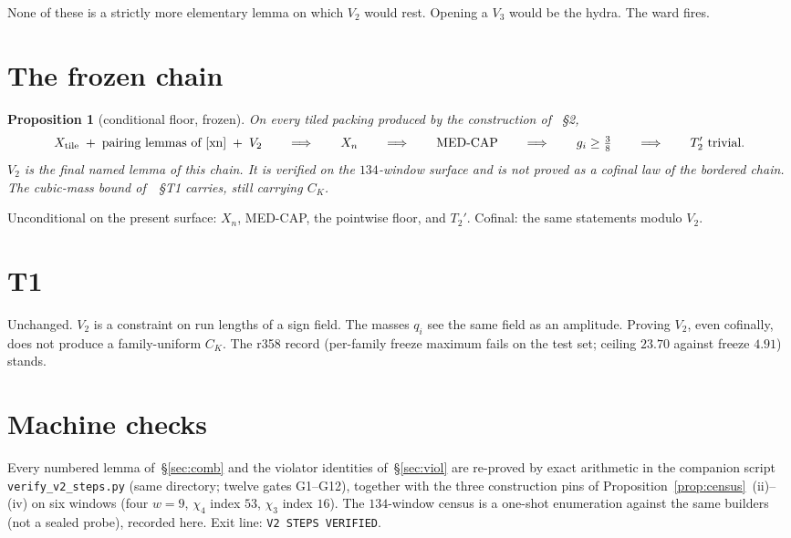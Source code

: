 \documentclass[11pt]{article}
\newtheorem{prop}{Proposition}
\theoremstyle{remark}
\begin{document}
None of these is a strictly more elementary lemma on which $V_2$
would rest.  Opening a $V_3$ would be the hydra.  The ward fires.

\section{The frozen chain}\label{sec:chain}

\begin{prop}[conditional floor, frozen]\label{prop:frozen}
On every tiled packing produced by the construction of
\cite{xn}~\S2,
\[
X_{\mathrm{tile}}
 \;+\;
\text{pairing lemmas of~\cite{xn}}
 \;+\;
 V_2
\qquad\Longrightarrow\qquad
 X_n
\qquad\Longrightarrow\qquad
\mathrm{MED\text{-}CAP}
\qquad\Longrightarrow\qquad
 g_i\ge\tfrac38
\qquad\Longrightarrow\qquad
 T_2'\ \text{trivial}.
\]
$V_2$ is the final named lemma of this chain.  It is verified on
the $134$-window surface and is not proved as a cofinal law of
the bordered chain.  The cubic-mass bound of~\cite{medcap}~\S T1
carries, still carrying $C_K$.
\end{prop}

Unconditional on the present surface: $X_n$, MED-CAP, the
pointwise floor, and $T_2'$.  Cofinal: the same statements
modulo $V_2$.

\section{T1}\label{sec:t1}

Unchanged.  $V_2$ is a constraint on run lengths of a sign field.
The masses $q_i$ see the same field as an amplitude.  Proving
$V_2$, even cofinally, does not produce a family-uniform $C_K$.
The r358 record (per-family freeze maximum fails on the test set;
ceiling $23.70$ against freeze $4.91$) stands.

\section{Machine checks}\label{sec:machine}

Every numbered lemma of~\S\ref{sec:comb} and the violator
identities of~\S\ref{sec:viol} are re-proved by exact arithmetic
in the companion script \texttt{verify\_v2\_steps.py} (same
directory; twelve gates G1--G12), together with the three construction pins of
Proposition~\ref{prop:census}~(ii)--(iv) on six windows (four
$w=9$, $\chi_4$ index $53$, $\chi_3$ index $16$).  The
$134$-window census is a one-shot enumeration against the same
builders (not a sealed probe), recorded here.  Exit line:
\texttt{V2 STEPS VERIFIED}.
\end{document}

